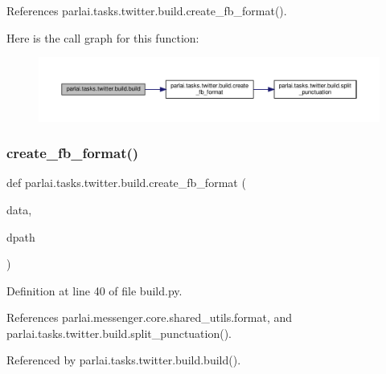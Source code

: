 References parlai.\+tasks.\+twitter.\+build.\+create\+\_\+fb\+\_\+format().

Here is the call graph for this function\+:
\nopagebreak
\begin{figure}[H]
\begin{center}
\leavevmode
\includegraphics[width=350pt]{namespaceparlai_1_1tasks_1_1twitter_1_1build_a8faa6a4ae6f2adaa22f068cc6781898d_cgraph}
\end{center}
\end{figure}
\mbox{\label{namespaceparlai_1_1tasks_1_1twitter_1_1build_ab36b25b09bea28cdf3278f910e5e9ff6}} 
\subsubsection{\texorpdfstring{create\+\_\+fb\+\_\+format()}{create\_fb\_format()}}
{\footnotesize\ttfamily def parlai.\+tasks.\+twitter.\+build.\+create\+\_\+fb\+\_\+format (\begin{DoxyParamCaption}\item[{}]{data,  }\item[{}]{dpath }\end{DoxyParamCaption})}



Definition at line 40 of file build.\+py.



References parlai.\+messenger.\+core.\+shared\+\_\+utils.\+format, and parlai.\+tasks.\+twitter.\+build.\+split\+\_\+punctuation().



Referenced by parlai.\+tasks.\+twitter.\+build.\+build().

